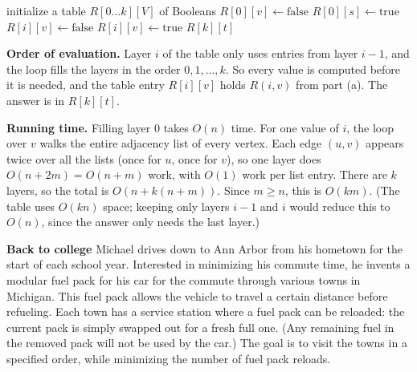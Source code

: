 \documentclass[11pt,addpoints,answers]{exam}
\begin{document}
\begin{questions}
\begin{parts}
\begin{solution}
      \begin{algorithmic}[1]
          \State initialize a table $R[0\ldots k][V]$ of Booleans
           
            \State $R[0][v] \gets \text{false}$
          \EndFor
          \State $R[0][s] \gets \text{true}$
           
              \State $R[i][v] \gets \text{false}$
                  \State $R[i][v] \gets \text{true}$
                \EndIf
              \EndFor
            \EndFor
          \EndFor
          \State \Return $R[k][t]$
        \EndFunction
      \end{algorithmic}

      \textbf{Order of evaluation.}
      Layer $i$ of the table only uses entries from layer $i-1$, and the loop fills the layers in the order $0,1,\dots,k$.
      So every value is computed before it is needed, and the table entry $R[i][v]$ holds $R(i,v)$ from part (a).
      The answer is in $R[k][t]$.

      \textbf{Running time.}
      Filling layer $0$ takes $O(n)$ time.
      For one value of $i$, the loop over $v$ walks the entire adjacency list of every vertex.
      Each edge $(u,v)$ appears twice over all the lists (once for $u$, once for $v$), so one layer does $O(n + 2m) = O(n+m)$ work, with $O(1)$ work per list entry.
      There are $k$ layers, so the total is $O(n + k(n+m))$.
      Since $m \ge n$, this is $O(km)$.
      (The table uses $O(kn)$ space; keeping only layers $i-1$ and $i$ would reduce this to $O(n)$, since the answer only needs the last layer.)
    \end{solution}
  \end{parts}

  \question \textbf{Back to college} 
  \nopagebreak
   Michael drives down to Ann Arbor from his hometown for the start of each school year.
   Interested in minimizing his commute time, he invents a modular fuel pack for his car for the commute through various towns in Michigan.
   This fuel pack allows the vehicle to travel a certain distance before refueling.
   Each town has a service station where a fuel pack can be reloaded: the current pack is simply swapped out for a fresh full one.
   (Any remaining fuel in the removed pack will not be used by the car.)
   The goal is to visit the towns in a specified order, while minimizing the number of fuel pack reloads.


\end{questions}
\end{document}
